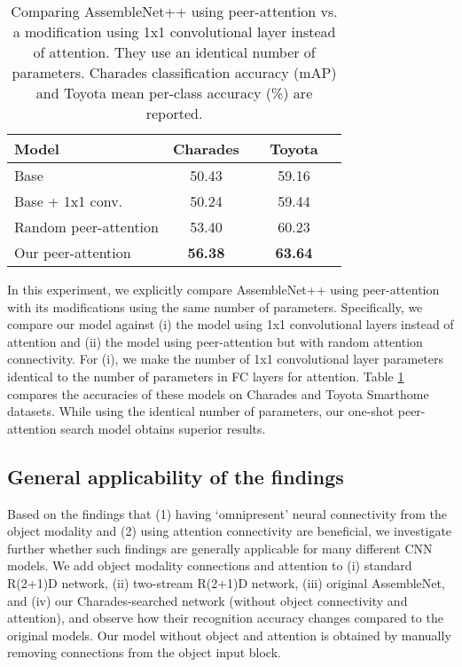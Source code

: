 \documentclass[runningheads]{llncs}
\begin{document}
\begin{table}
\setlength\tabcolsep{5pt}
\caption{Comparing AssembleNet++ using peer-attention vs. a modification using 1x1 convolutional layer instead of attention. They use an identical number of parameters. Charades classification accuracy (mAP) and Toyota mean per-class accuracy (\%) are reported.}
\label{tab:ablation}
\begin{center}
\begin{tabular}{l|c|c}
\hline
Model &  Charades & ~~Toyota~~ \\            
\hline
Base & 50.43 & 59.16 \\
Base + 1x1 conv. & 50.24 & 59.44 \\
Random peer-attention & 53.40 & 60.23 \\
Our peer-attention & \textbf{56.38} & \textbf{63.64} \\
\hline
\end{tabular}
\end{center}
\label{tab:exp-abl}
\end{table}



In this experiment, we explicitly compare AssembleNet++ using peer-attention with its modifications using the same number of parameters. Specifically, we compare our model against (i) the model using 1x1 convolutional layers instead of attention and (ii) the model using peer-attention but with random attention connectivity. For (i), we make the number of 1x1 convolutional layer parameters identical to the number of parameters in FC layers for attention. Table \ref{tab:exp-abl} compares the accuracies of these models on Charades and Toyota Smarthome datasets. While using the identical number of parameters, our one-shot peer-attention search model obtains superior results. 





\subsection{General applicability of the findings}
\label{subsec:exp-general}

Based on the findings that (1) having `omnipresent' neural connectivity from the object modality and (2) using attention connectivity are beneficial, we investigate further whether such findings are generally applicable for many different CNN models. We add object modality connections and attention to (i) standard R(2+1)D network, (ii) two-stream R(2+1)D network, (iii) original AssembleNet, and (iv) our Charades-searched network (without object connectivity and attention), and observe how their recognition accuracy changes compared to the original models. Our model without object and attention is obtained by manually removing connections from the object input block.
\end{document}
